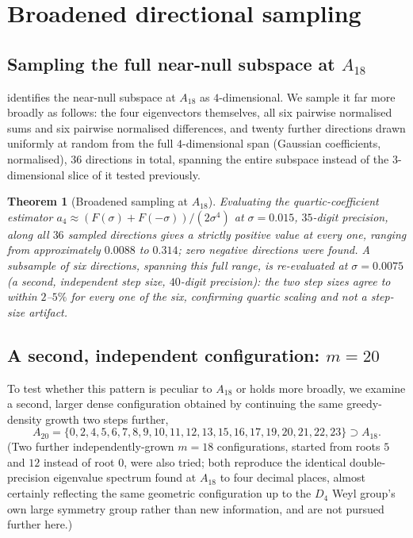 \documentclass[11pt,reqno]{amsart}
\renewcommand{\_}{\origunderscore\allowbreak}
\numberwithin{equation}{section}
\theoremstyle{plain}
\newtheorem{thm}{Theorem}[section]
\theoremstyle{definition}
\theoremstyle{remark}
\begin{document}
\section{Broadened directional sampling}\label{sec:broad-sample}

\subsection{Sampling the full near-null subspace at $A_{18}$}

 identifies the near-null subspace at
$A_{18}$ as $4$-dimensional. We sample it far more broadly
as follows: the four eigenvectors themselves, all six
pairwise normalised sums and six pairwise normalised differences, and
twenty further directions drawn uniformly at random from the full
$4$-dimensional span (Gaussian coefficients, normalised), $36$
directions in total, spanning the entire subspace instead of the $3$-dimensional slice of it tested previously.

\begin{thm}[Broadened sampling at $A_{18}$]\label{thm:broad-sample-18-new}
Evaluating the quartic-coefficient estimator
$a_4\approx(F(\sigma)+F(-\sigma))/(2\sigma^4)$ at $\sigma=0.015$,
$35$-digit precision, along all $36$ sampled directions gives a
strictly positive value at every one, ranging from approximately
$0.0088$ to $0.314$; zero negative directions were found. A subsample
of six directions, spanning this full range, is re-evaluated at
$\sigma=0.0075$ (a second, independent step size, $40$-digit
precision): the two step sizes agree to within $2$--$5\%$ for every one
of the six, confirming quartic scaling and not a step-size artifact.
\end{thm}

\subsection{A second, independent configuration: $m=20$}

To test whether this pattern is peculiar to $A_{18}$ or holds more
broadly, we examine a second, larger dense configuration obtained by
continuing the same greedy-density growth two steps further,
\[
  A_{20} = \{0,2,4,5,6,7,8,9,10,11,12,13,15,16,17,19,20,21,22,23\}
  \supset A_{18}.
\]
(Two further independently-grown $m=18$ configurations, started from
roots $5$ and $12$ instead of root $0$, were also tried; both reproduce
the identical double-precision eigenvalue spectrum found at $A_{18}$ to
four decimal places, almost certainly reflecting the same geometric
configuration up to the $D_4$ Weyl group's own large symmetry group
rather than new information, and are not pursued further here.)
\end{document}
